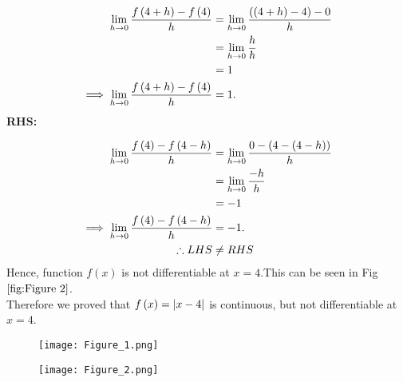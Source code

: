 \documentclass[journal,12pt,twocolumn]{IEEEtran}
\begin{document}
            \begin{align}
                 \lim_{h \to 0}\frac{f\left(4 + h\right) - f\left(4\right)}{h} & = \lim_{h \to 0}\frac{\left(\left(4+h\right) - 4\right) - 0}{h}\\
                                                                                        & = \lim_{h \to 0}\frac{h}{h}\\
                                                                                        & = 1\\
                 \implies \lim_{h \to 0}\frac{f\left(4 + h\right) - f\left(4\right)}{h} & = 1.
            \end{align}       
 \textbf{RHS:}

            \begin{align}
                 \lim_{h \to 0}\frac{f\left(4\right) - f\left(4-h\right)}{h}  &= \lim_{h \to 0}\frac{0 -\left( 4 - \left(4 -h\right)\right)}{h}\\
                                                                                      &= \lim_{h \to 0}\frac{-h}{h}\\
                                                                                      & = -1\\
                 \implies  \lim_{h \to 0}\frac{f\left(4\right) - f\left(4-h\right)}{h} &= -1.\\
                 \therefore LHS &\neq RHS \nonumber
            \end{align}
    Hence, function $f(x)$ is not differentiable at $ x = 4 $.This can be seen in Fig $\ref{fig:Figure 2}$.\\
    Therefore we proved that  $ f\left(x\right) = |x-4| $ is continuous, but not differentiable at $ x = 4$.
\begin{figure}[h!]
     \centering
     \texttt{[image: Figure\_1.png]}
     \caption{}
     \label{fig:Figure 1}
\end{figure}
\begin{figure}[h!]
     \centering
     \texttt{[image: Figure\_2.png]}
     \caption{}
     \label{fig:Figure 2}
\end{figure}
\end{document}
